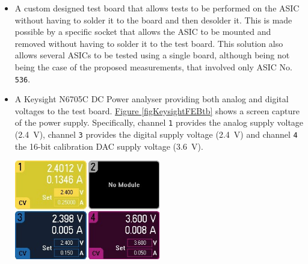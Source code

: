 \begin{itemize}
    \itemsep0em 
    \item A custom designed test board that allows tests to be performed on the ASIC without having to solder it to the board and then desolder it. This is made possible by a specific socket that allows the ASIC to be mounted and removed without having to solder it to the test board. This solution also allows several ASICs to be tested using a single board, although being not being the case of the proposed measurements, that involved only ASIC No. \texttt{536}.
    \item A Keysight N6705C DC Power analyser providing both analog and digital voltages to the test board. \hyperref[figKeysightFEBtb]{Figure \ref{figKeysightFEBtb}} shows a screen capture of the power supply. Specifically, channel \texttt{1} provides the analog supply voltage (\SI{2.4}{\volt}), channel \texttt{3} provides the digital supply voltage (\SI{2.4}{\volt}) and channel \texttt{4} the 16-bit calibration DAC supply voltage (\SI{3.6}{\volt}).
    
    \begin{minipage}{\linewidth}
    \vspace{0.4cm}
        \centering
        \includegraphics[width=0.5\textwidth]{Images/chap1/power_supply_screen_TB.jpg}
        \label{figKeysightFEBtb}
        \vspace{0.4cm}
    \end{minipage}
    

\end{itemize}
